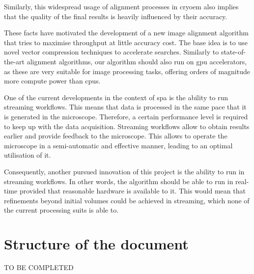 \documentclass[../main.tex]{subfiles}
\begin{document}
Similarly, this widespread usage of alignment processes in \gls{cryoem} also implies that the quality of the final results is heavily influenced by their accuracy.

These facts have motivated the development of a new image alignment algorithm that tries to maximise throughput at little accuracy cost. The base idea is to use novel vector compression techniques to accelerate searches. Similarly to state-of-the-art alignment algorithms, our algorithm should also run on \gls{gpu} accelerators, as these are very suitable for image processing tasks, offering orders of magnitude more compute power than \glspl{cpu}.

One of the current developments in the context of \gls{spa} is the ability to run streaming workflows. This means that data is processed in the same pace that it is generated in the microscope. Therefore, a certain performance level is required to keep up with the data acquisition. Streaming workflows allow to obtain results earlier and provide feedback to the microscope. This allows to operate the microscope in a semi-automatic and effective manner, leading to an optimal utilisation of it.

Consequently, another pursued innovation of this project is the ability to run in streaming workflows. In other words, the algorithm should be able to run in real-time provided that reasonable hardware is available to it. This would mean that refinements beyond initial volumes could be achieved in streaming, which none of the current processing suits is able to.

\section{Structure of the document}
TO BE COMPLETED
\end{document}
